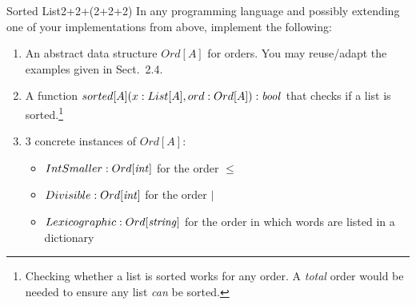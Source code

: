 \documentclass[a4paper]{article}
\begin{document}
\begin{problem}{Sorted List}{2+2+(2+2+2)}
In any programming language and possibly extending one of your implementations from above, implement the following:
\begin{enumerate}
 \item An abstract data structure $Ord[A]$ for orders. You may reuse/adapt the examples given in Sect.~2.4.
 \item A function $sorted[A](x: List[A], ord: Ord[A]): \mathit{bool}$ that checks if a list is sorted.\footnote{Checking whether a list is sorted works for any order. A \emph{total} order would be needed to ensure any list \emph{can} be sorted.}
 \item $3$ concrete instances of $Ord[A]$:
  \begin{itemize}
   \item $IntSmaller:Ord[\mathit{int}]$ for the order  $\leq$
   \item $Divisible:Ord[\mathit{int}]$ for the order $|$
   \item $Lexicographic:Ord[\mathit{string}]$ for the order in which words are listed in a dictionary
  \end{itemize}
\end{enumerate}
\end{problem}
\end{document}
